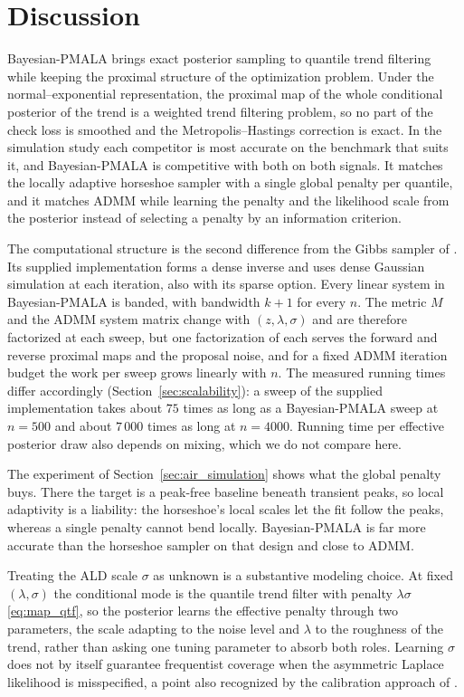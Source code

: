
\section{Discussion}
\label{sec:discussion}

Bayesian-PMALA brings exact posterior sampling to quantile trend filtering while keeping the proximal structure of the optimization problem. Under the normal--exponential representation, the proximal map of the whole conditional posterior of the trend is a weighted trend filtering problem, so no part of the check loss is smoothed and the Metropolis--Hastings correction is exact. In the simulation study each competitor is most accurate on the benchmark that suits it, and Bayesian-PMALA is competitive with both on both signals. It matches the locally adaptive horseshoe sampler with a single global penalty per quantile, and it matches ADMM while learning the penalty and the likelihood scale from the posterior instead of selecting a penalty by an information criterion.

The computational structure is the second difference from the Gibbs sampler of \citet{onizuka2024fast}. Its supplied implementation forms a dense inverse and uses dense Gaussian simulation at each iteration, also with its sparse option. Every linear system in Bayesian-PMALA is banded, with bandwidth $k+1$ for every $n$. The metric $M$ and the ADMM system matrix change with $(z, \lambda, \sigma)$ and are therefore factorized at each sweep, but one factorization of each serves the forward and reverse proximal maps and the proposal noise, and for a fixed ADMM iteration budget the work per sweep grows linearly with $n$. The measured running times differ accordingly (Section~\ref{sec:scalability}): a sweep of the supplied implementation takes about $75$ times as long as a Bayesian-PMALA sweep at $n = 500$ and about $7\,000$ times as long at $n = 4000$. Running time per effective posterior draw also depends on mixing, which we do not compare here.

The experiment of Section~\ref{sec:air_simulation} shows what the global penalty buys. There the target is a peak-free baseline beneath transient peaks, so local adaptivity is a liability: the horseshoe's local scales let the fit follow the peaks, whereas a single penalty cannot bend locally. Bayesian-PMALA is far more accurate than the horseshoe sampler on that design and close to ADMM.

Treating the ALD scale $\sigma$ as unknown is a substantive modeling choice. At fixed $(\lambda, \sigma)$ the conditional mode is the quantile trend filter with penalty $\lambda\sigma$ \eqref{eq:map_qtf}, so the posterior learns the effective penalty through two parameters, the scale adapting to the noise level and $\lambda$ to the roughness of the trend, rather than asking one tuning parameter to absorb both roles. Learning $\sigma$ does not by itself guarantee frequentist coverage when the asymmetric Laplace likelihood is misspecified, a point also recognized by the calibration approach of \citet{onizuka2024fast}.

